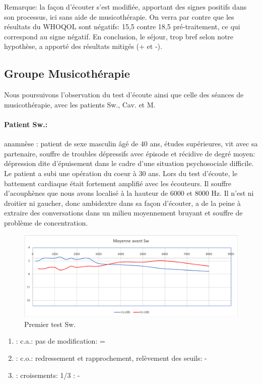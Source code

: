 Remarque: la façon d'écouter s'est modifiée, apportant des signes positifs dans son processus,  ici sans 
aide de musicothérapie. On verra par contre que les résultats du WHOQOL sont négatifs: 15,5 contre 18,5 
pré-traitement, ce qui
correspond au signe négatif.
En conclusion, le séjour, trop bref selon notre hypothèse, a apporté des résultats mitigés (+ et -). 


\subsection{Groupe Musicothérapie}
Nous poursuivons l'observation du test d'écoute ainsi que celle des séances de musicothérapie, avec 
les 
patients Sw., Cav. et M.
\paragraph{ Patient Sw.:} anamnèse : patient de sexe masculin âgé de 40 ans, études supérieures, vit 
avec sa partenaire, souffre de troubles dépressifs avec épisode et récidive de 
degré moyen: dépression dite d'épuisement dans le cadre d'une situation psychosociale difficile.
Le patient a subi une opération du coeur à 30 ans. Lors du test d'écoute, le battement  cardiaque était 
fortement amplifié avec les écouteurs. Il souffre d'acouphènes que nous avons localisé à la hauteur de 
6000 
et 8000 Hz. Il n'est ni droitier ni gaucher, donc ambidextre dans sa façon d'écouter, a de la peine à 
extraire 
des conversations dans un milieu moyennement bruyant et souffre de problème de concentration.



 \begin{figure}[th]
\centering
\includegraphics[width=0.7\linewidth]{images/graphiques/sw_pre.png}
\caption[ \textbf{Groupe Musicothérapie}: Patient Sw. : 1°Test]{Premier test Sw.}

\end{figure}

	\begin{enumerate}

 		\item : c.a.: pas de modification: = %

 		\item : c.o.: redressement et rapprochement,
                  relèvement des seuils: -       %
 		\item : croisements: 1/3 :  -

                \end{enumerate}

